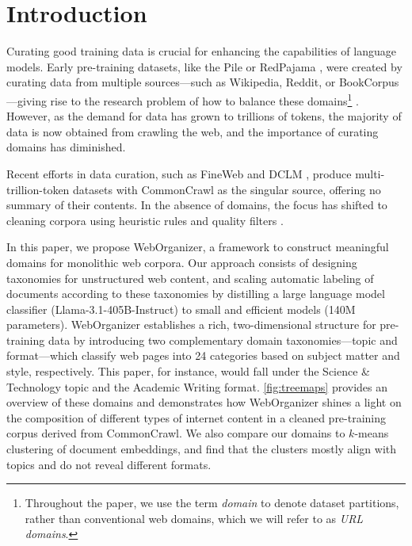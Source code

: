
\vspace{1em}
\section{Introduction} \label{sec:introduction}

\ificml\setcounter{footnote}{1}\fi
Curating good training data is crucial for enhancing the capabilities of language models.
Early pre-training datasets, like the Pile \citep{pile} or RedPajama \citep{together2023redpajama}, were created by curating data from multiple sources---such as Wikipedia, Reddit, or BookCorpus \citep{zhu2015aligning}---giving rise to the research problem of how to balance these domains\footnote{Throughout the paper, we use the term {\it domain} to denote dataset partitions, rather than conventional web domains, which we will refer to as {\it URL domains}.} \citep{xie2023doremi}.
However, as the demand for data has grown to trillions of tokens, 
the majority of data is now obtained from crawling the web, and the importance of curating domains has diminished.

Recent efforts in data curation, such as FineWeb \citep{penedo2024finewebdatasetsdecantingweb} and DCLM \citep{li2024datacomplm}, produce multi-trillion-token datasets with CommonCrawl as the singular source, 
offering no summary of their contents.
In the absence of domains, the focus has shifted to cleaning corpora using heuristic rules \citep{raffel2020exploring,rae2021scaling,penedo2023refinedweb} and quality filters \citep{wettig2024qurating, sachdeva2024train,penedo2024finewebdatasetsdecantingweb,li2024datacomplm}.



In this paper, we propose WebOrganizer, a framework to construct meaningful domains for monolithic web corpora.
Our approach consists of designing taxonomies for unstructured web content, and 
scaling automatic labeling of documents according to these taxonomies by distilling a large language model classifier (Llama-3.1-405B-Instruct) to small and efficient models (140M parameters). %
\mbox{WebOrganizer} establishes a rich, two-dimensional structure for pre-training data by introducing two complementary domain taxonomies---{\topics topic} and {\formats format}---which classify web pages into 24 categories based on subject matter and style, respectively. This paper, for instance, would fall under the {\atopic Science \& Technology} topic and the {\aformat Academic Writing} format.
\autoref{fig:treemaps} provides an overview of these domains and demonstrates how WebOrganizer shines a light on the composition of different types of internet content in a cleaned pre-training corpus derived from CommonCrawl.
We also compare our domains to $k$-means clustering of document embeddings, 
and find that the clusters mostly align with topics and do not reveal different formats.



